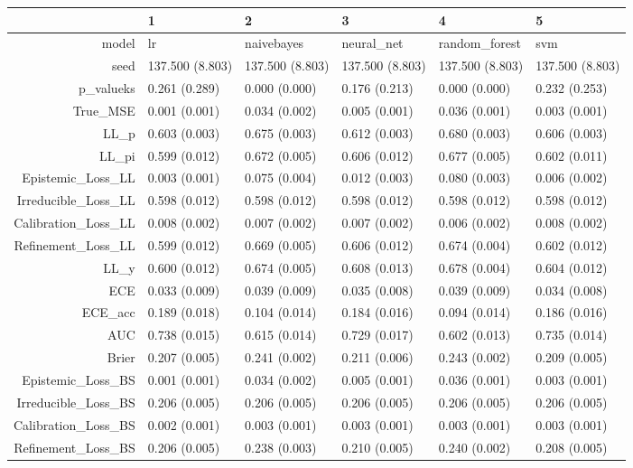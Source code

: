 \begin{table}[ht]
\centering
\begin{tabular}{rlllll}
  \hline
 & 1 & 2 & 3 & 4 & 5 \\ 
  \hline
model & lr & naivebayes & neural\_net & random\_forest & svm \\ 
  seed & 137.500 (8.803) & 137.500 (8.803) & 137.500 (8.803) & 137.500 (8.803) & 137.500 (8.803) \\ 
  p\_valueks & 0.261 (0.289) & 0.000 (0.000) & 0.176 (0.213) & 0.000 (0.000) & 0.232 (0.253) \\ 
  True\_MSE & 0.001 (0.001) & 0.034 (0.002) & 0.005 (0.001) & 0.036 (0.001) & 0.003 (0.001) \\ 
  LL\_p & 0.603 (0.003) & 0.675 (0.003) & 0.612 (0.003) & 0.680 (0.003) & 0.606 (0.003) \\ 
  LL\_pi & 0.599 (0.012) & 0.672 (0.005) & 0.606 (0.012) & 0.677 (0.005) & 0.602 (0.011) \\ 
  Epistemic\_Loss\_LL & 0.003 (0.001) & 0.075 (0.004) & 0.012 (0.003) & 0.080 (0.003) & 0.006 (0.002) \\ 
  Irreducible\_Loss\_LL & 0.598 (0.012) & 0.598 (0.012) & 0.598 (0.012) & 0.598 (0.012) & 0.598 (0.012) \\ 
  Calibration\_Loss\_LL & 0.008 (0.002) & 0.007 (0.002) & 0.007 (0.002) & 0.006 (0.002) & 0.008 (0.002) \\ 
  Refinement\_Loss\_LL & 0.599 (0.012) & 0.669 (0.005) & 0.606 (0.012) & 0.674 (0.004) & 0.602 (0.012) \\ 
  LL\_y & 0.600 (0.012) & 0.674 (0.005) & 0.608 (0.013) & 0.678 (0.004) & 0.604 (0.012) \\ 
  ECE & 0.033 (0.009) & 0.039 (0.009) & 0.035 (0.008) & 0.039 (0.009) & 0.034 (0.008) \\ 
  ECE\_acc & 0.189 (0.018) & 0.104 (0.014) & 0.184 (0.016) & 0.094 (0.014) & 0.186 (0.016) \\ 
  AUC & 0.738 (0.015) & 0.615 (0.014) & 0.729 (0.017) & 0.602 (0.013) & 0.735 (0.014) \\ 
  Brier & 0.207 (0.005) & 0.241 (0.002) & 0.211 (0.006) & 0.243 (0.002) & 0.209 (0.005) \\ 
  Epistemic\_Loss\_BS & 0.001 (0.001) & 0.034 (0.002) & 0.005 (0.001) & 0.036 (0.001) & 0.003 (0.001) \\ 
  Irreducible\_Loss\_BS & 0.206 (0.005) & 0.206 (0.005) & 0.206 (0.005) & 0.206 (0.005) & 0.206 (0.005) \\ 
  Calibration\_Loss\_BS & 0.002 (0.001) & 0.003 (0.001) & 0.003 (0.001) & 0.003 (0.001) & 0.003 (0.001) \\ 
  Refinement\_Loss\_BS & 0.206 (0.005) & 0.238 (0.003) & 0.210 (0.005) & 0.240 (0.002) & 0.208 (0.005) \\ 
   \hline
\end{tabular}
\end{table}
